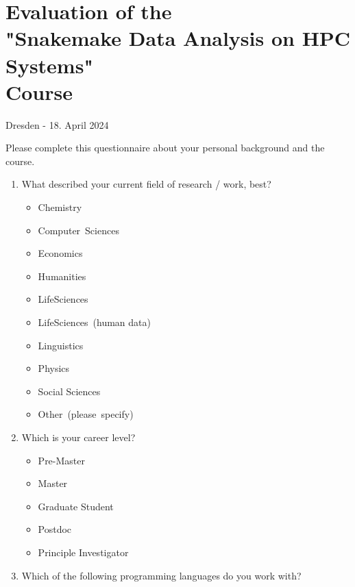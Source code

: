 \documentclass{scrartcl}
\begin{document}
\section*{Evaluation of the\\"Snakemake Data Analysis on HPC Systems"\\Course}

\begin{center}
    Dresden - 18. April 2024
\end{center}


Please complete this questionnaire about your personal background and the course.
\begin{enumerate}
\item What described your current field of research / work, best?
  \begin{multicols}{4}
    \begin{itemize}[label={\Square}]
      \item Chemistry
      \item Computer\ Sciences
      \item Economics
      \item Humanities
      \item LifeSciences
      \item LifeSciences\ (human data)
      \item Linguistics
      \item Physics
      \item Social Sciences
      \item Other\ (please\ specify)
    \end{itemize}
  \end{multicols}
\item Which is your career level?
  \begin{multicols}{3}
    \begin{itemize}[label={\Square}]
      \item Pre-Master
      \item Master
      \item Graduate Student
      \item Postdoc
      \item Principle Investigator
    \end{itemize}
  \end{multicols}
\item Which of the following programming languages do you work with?
  \begin{multicols}{4}
    \begin{itemize}[label={\Square}]

\end{itemize}
\end{multicols}
\end{enumerate}
\end{document}
